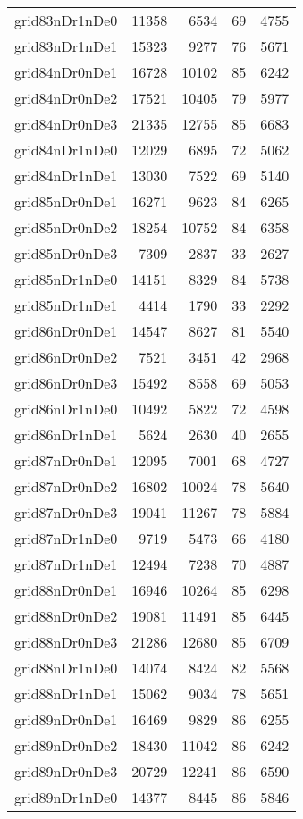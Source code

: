 \begin{longtable}{lrrrr}
grid83nDr1nDe0 & 11358 & 6534 & 69 & 4755 \\
grid83nDr1nDe1 & 15323 & 9277 & 76 & 5671 \\
grid84nDr0nDe1 & 16728 & 10102 & 85 & 6242 \\
grid84nDr0nDe2 & 17521 & 10405 & 79 & 5977 \\
grid84nDr0nDe3 & 21335 & 12755 & 85 & 6683 \\
grid84nDr1nDe0 & 12029 & 6895 & 72 & 5062 \\
grid84nDr1nDe1 & 13030 & 7522 & 69 & 5140 \\
grid85nDr0nDe1 & 16271 & 9623 & 84 & 6265 \\
grid85nDr0nDe2 & 18254 & 10752 & 84 & 6358 \\
grid85nDr0nDe3 & 7309 & 2837 & 33 & 2627 \\
grid85nDr1nDe0 & 14151 & 8329 & 84 & 5738 \\
grid85nDr1nDe1 & 4414 & 1790 & 33 & 2292 \\
grid86nDr0nDe1 & 14547 & 8627 & 81 & 5540 \\
grid86nDr0nDe2 & 7521 & 3451 & 42 & 2968 \\
grid86nDr0nDe3 & 15492 & 8558 & 69 & 5053 \\
grid86nDr1nDe0 & 10492 & 5822 & 72 & 4598 \\
grid86nDr1nDe1 & 5624 & 2630 & 40 & 2655 \\
grid87nDr0nDe1 & 12095 & 7001 & 68 & 4727 \\
grid87nDr0nDe2 & 16802 & 10024 & 78 & 5640 \\
grid87nDr0nDe3 & 19041 & 11267 & 78 & 5884 \\
grid87nDr1nDe0 & 9719 & 5473 & 66 & 4180 \\
grid87nDr1nDe1 & 12494 & 7238 & 70 & 4887 \\
grid88nDr0nDe1 & 16946 & 10264 & 85 & 6298 \\
grid88nDr0nDe2 & 19081 & 11491 & 85 & 6445 \\
grid88nDr0nDe3 & 21286 & 12680 & 85 & 6709 \\
grid88nDr1nDe0 & 14074 & 8424 & 82 & 5568 \\
grid88nDr1nDe1 & 15062 & 9034 & 78 & 5651 \\
grid89nDr0nDe1 & 16469 & 9829 & 86 & 6255 \\
grid89nDr0nDe2 & 18430 & 11042 & 86 & 6242 \\
grid89nDr0nDe3 & 20729 & 12241 & 86 & 6590 \\
grid89nDr1nDe0 & 14377 & 8445 & 86 & 5846 \\

\end{longtable}
